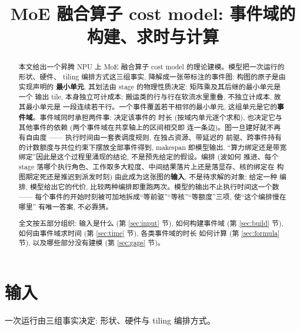 \documentclass[11pt,a4paper]{article}
\title{MoE 融合算子 cost model: 事件域的构建、求时与计算}
\author{}
\date{}
\begin{document}
\maketitle

\begin{abstract}
本文给出一个昇腾 NPU 上 MoE 融合算子 cost model 的理论建模。模型把一次运行的形状、硬件、
tiling 编排方式这三组事实, 降解成一张带标注的事件图: 构图的原子是由实现声明的
\textbf{最小单元}, 其划法由 stage 的物理性质决定: 矩阵乘及其后继的最小单元是一个
输出 tile, 本身独立可计成本; 搬运类的行与行在软流水里重叠, 不独立计成本, 故其最小单元是
一段连续若干行。一个事件覆盖若干相邻的最小单元, 这组单元是它的\textbf{事件域}。事件域同时承担两件事: 决定该事件的
时长 (按域内单元逐个求和), 也决定它与其他事件的依赖 (两个事件域在共享轴上的区间相交即
连一条边)。图一旦建好就不再有自由度 —— 执行时间由一套表调度规则, 在独占资源、带延迟的
前驱、跨事件持有的计数额度与共位约束下摆放全部事件得到, makespan 即模型输出,
``算力绑定还是带宽绑定''因此是这个过程里涌现的结论, 不是预先给定的假设。编排 (波如何
推进、每个 stage 落哪个执行角色、工作取多大粒度、中间结果落片上还是落显存、核的绑定在
构图期定死还是推迟到派发时刻) 由此成为这张图的\textbf{输入}, 不是待求解的对象: 给定一种
编排, 模型给出它的代价, 比较两种编排即重跑两次。模型的输出不止执行时间这一个数 ——
每个事件的开始时刻被可加地拆成``等前驱''``等核''``等额度''三项, 使``这个编排慢在哪里''
有唯一答案, 不必靠猜。

全文按五部分组织: 输入是什么 (第 \ref{sec:input} 节), 如何构建事件域
(第 \ref{sec:build} 节), 如何由事件域求时间 (第 \ref{sec:time} 节), 各类事件域的时长
如何计算 (第 \ref{sec:formula} 节), 以及哪些部分没有建模 (第 \ref{sec:gaps} 节)。
\end{abstract}

\tableofcontents

\section{输入}
\label{sec:input}

一次运行由三组事实决定: 形状、硬件与 tiling 编排方式。
\end{document}
